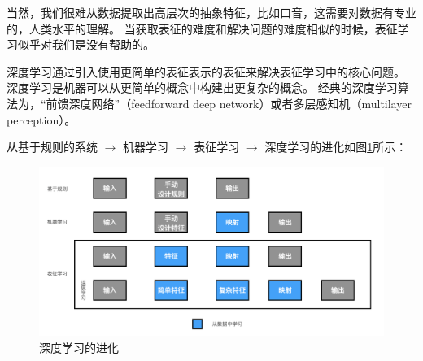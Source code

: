 当然，我们很难从数据提取出高层次的抽象特征，比如口音，这需要对数据有专业的，人类水平的理解。
当获取表征的难度和解决问题的难度相似的时候，表征学习似乎对我们是没有帮助的。


深度学习通过引入使用更简单的表征表示的表征来解决表征学习中的核心问题。
深度学习是机器可以从更简单的概念中构建出更复杂的概念。
经典的深度学习算法为，“前馈深度网络”（feedforward deep network）或者多层感知机（multilayer perception）。


从基于规则的系统 $\rightarrow$ 机器学习 $\rightarrow{}$ 表征学习 $\rightarrow{}$ 深度学习的进化如图\ref{fig:introduction-deep-learning}所示：
\begin{figure}[!ht]
  \centering
  \includegraphics[width=\textwidth]{introduction-deep-learning.png}
  \caption{深度学习的进化}
  \label{fig:introduction-deep-learning}
\end{figure}






